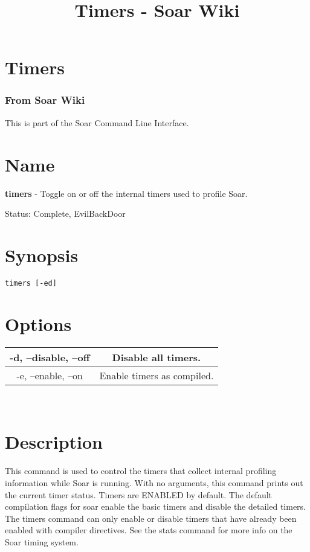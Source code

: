 \documentclass[10pt]{article}
\title{Timers - Soar Wiki}
\begin{document}
\section*{Timers}
\subsubsection*{From Soar Wiki}


 This is part of the Soar Command Line Interface. 
\section*{ Name }


 \textbf{timers}
 - Toggle on or off the internal timers used to profile Soar. 


 Status: Complete, EvilBackDoor
\section*{ Synopsis }
\begin{verbatim}
timers [-ed]

\end{verbatim}
\section*{ Options }


\begin{tabular}{|c|c|}
\hline 
 -d, --disable, --off  & Disable all timers.  \\
 \hline 
 -e, --enable, --on  & Enable timers as compiled.  \\
 \hline 

\end{tabular}



 \\ 

\section*{ Description }


 This command is used to control the timers that collect internal profiling information while Soar is running. With no arguments, this command prints out the current timer status. Timers are ENABLED by default. The default compilation flags for soar enable the basic timers and disable the detailed timers. The timers command can only enable or disable timers that have already been enabled with compiler directives. See the stats command for more info on the Soar timing system. 
\end{document}
